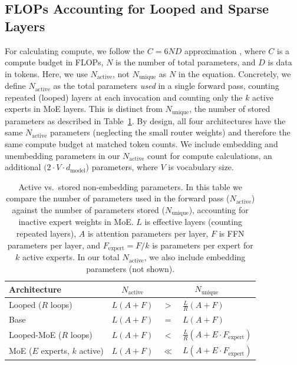 \documentclass{article}
\begin{document}
\subsection{FLOPs Accounting for Looped and Sparse Layers}
For calculating compute, we follow the $C = 6ND$ approximation \citep{kaplan_scaling_2020,hoffmann_training_2022}, where $C$ is a compute budget in FLOPs, $N$ is the number of total parameters, and $D$ is data in tokens. Here, we use $N_\text{active}$, not $N_\text{unique}$ as $N$ in the equation. Concretely, we define $N_{\text{active}}$ as the total parameters \textit{used} in a single forward pass, counting repeated (looped) layers at each invocation and counting only the $k$ active experts in MoE layers. This is distinct from $N_{\text{unique}}$, the number of stored parameters as described in Table~\ref{tab:flops}. By design, all four architectures have the same $N_{\text{active}}$ parameters (neglecting the small router weights) and therefore the same compute budget at matched token counts. We include embedding and unembedding parameters in our $N_\text{active}$ count for compute calculations, an additional $(2  \cdot V \cdot d_\text{model}$) parameters, where $V$ is vocabulary size.

\begin{table}[t]
\centering
\caption{Active vs.\ stored non-embedding parameters. In this table we compare the number of parameters used in the forward pass ($N_\text{active}$) against the number of parameters stored ($N_\text{unique}$), accounting for inactive expert weights in MoE. $L$ is effective layers (counting repeated layers), $A$ is attention parameters per layer, $F$ is FFN parameters per layer, and $F_{\text{expert}} = F / k$ is parameters per expert for $k$ active experts. In our total $N_\text{active}$, we also include embedding parameters (not shown).}
\label{tab:flops}
\begin{tabular}{l r @{\;} c @{\;} l}
\toprule
Architecture & \multicolumn{1}{c}{$N_{\text{active}}$} & \multicolumn{2}{c}{\hspace{-2.5em}$N_{\text{unique}}$} \\
\midrule
Looped ($R$ loops) & $L(A + F)$ & $>$ & $\frac{L}{R}(A + F)$ \\
Base & $L(A + F)$ & $=$ & $L(A + F)$ \\
Looped-MoE ($R$ loops) & $L(A + F)$ & $<$ & $\frac{L}{R}(A + E \cdot F_{\text{expert}})$ \\
MoE ($E$ experts, $k$ active) & $L(A + F)$ & $\ll$ & $L(A + E \cdot F_{\text{expert}})$ \\
\bottomrule
\end{tabular}
\end{table}
\end{document}

